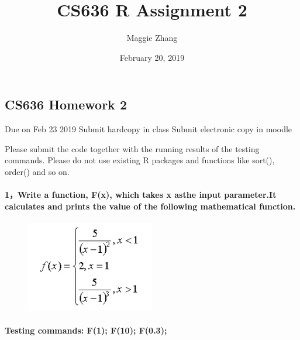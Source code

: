 \documentclass[]{article}
\title{CS636 R Assignment 2}
\author{Maggie Zhang}
\date{February 20, 2019}
\let\oldparagraph\paragraph
\renewcommand{\paragraph}[1]{\oldparagraph{#1}\mbox{}}
\begin{document}
\maketitle

\subsection{CS636 Homework 2}\label{cs636-homework-2}

Due on Feb 23 2019 Submit hardcopy in class Submit electronic copy in
moodle

Please submit the code together with the running results of the testing
commands. Please do not use existing R packages and functions like
sort(), order() and so on.

\paragraph{1，Write a function, F(x), which takes x asthe input
parameter.It calculates and prints the value of the following
mathematical
function.}\label{write-a-function-fx-which-takes-x-asthe-input-parameter.it-calculates-and-prints-the-value-of-the-following-mathematical-function.}

\begin{figure}
\centering
\includegraphics{CS636_R_Assignment_2_Pic.png}
\caption{}
\end{figure}

\paragraph{Testing commands: F(1); F(10);
F(0.3);}\label{testing-commands-f1-f10-f0.3}
\end{document}

